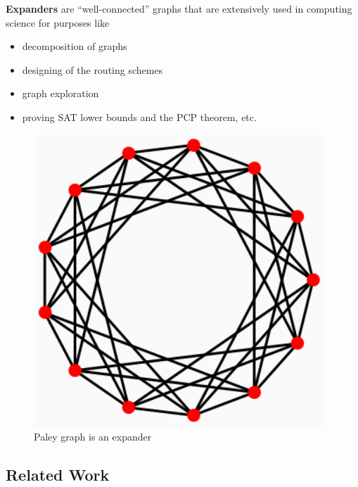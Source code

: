 \documentclass{beamer}
\newcommand{\autotitle}{\secname\ifdefempty{\subsecname}{}{~--- \subsecname}}
\begin{document}
\begin{frame}{\autotitle}
    \textbf{Expanders} are ``well-connected'' graphs that are extensively used
    in computing science for purposes like
    \begin{itemize}
        \item decomposition of graphs
        \item designing of the routing schemes
        \item graph exploration
        \item proving SAT lower bounds and the PCP theorem, etc.
    \end{itemize}
    \begin{figure}
        \centering
        \includegraphics[scale=0.3]{images/paley_grey}
        \caption{Paley graph is an expander}
    \end{figure}
\end{frame}

\subsection{Related Work}
\end{document}
